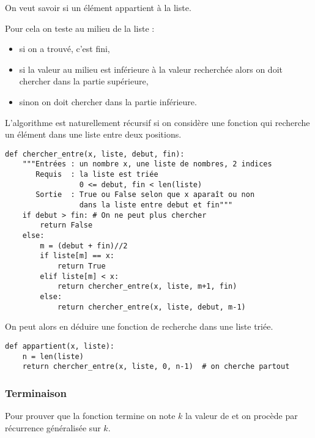 On veut savoir si un élément appartient à la liste.

Pour cela on teste au milieu de la liste :
\begin{itemize}
\item si on a trouvé, c'est fini,
\item si la valeur au milieu est inférieure à la valeur recherchée alors on doit chercher dans la partie supérieure,
\item sinon on doit chercher dans la partie inférieure.
\end{itemize}
L'algorithme est naturellement récursif si on considère une fonction qui recherche un élément dans une liste entre deux positions.
\begin{lstlisting}
def chercher_entre(x, liste, debut, fin):
    """Entrées : un nombre x, une liste de nombres, 2 indices
       Requis  : la liste est triée
                 0 <= debut, fin < len(liste)
       Sortie  : True ou False selon que x aparaît ou non 
                 dans la liste entre debut et fin"""
    if debut > fin: # On ne peut plus chercher 
        return False
    else:
        m = (debut + fin)//2 
        if liste[m] == x:
            return True    
        elif liste[m] < x: 
            return chercher_entre(x, liste, m+1, fin) 
        else: 
            return chercher_entre(x, liste, debut, m-1)
\end{lstlisting}
On peut alors en déduire une fonction de recherche dans une liste triée.
\begin{lstlisting}
def appartient(x, liste):
    n = len(liste)
    return chercher_entre(x, liste, 0, n-1)  # on cherche partout
\end{lstlisting}
\subsubsection{Terminaison}
Pour prouver que la fonction  termine on note $k$ la valeur de  et on procède par récurrence généralisée sur $k$.


